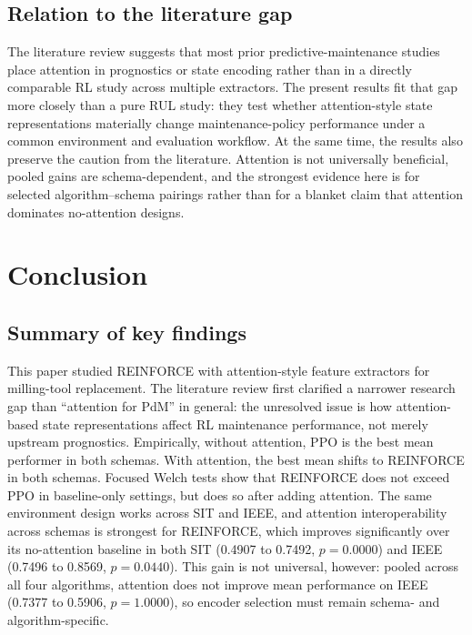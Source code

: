 \documentclass[sn-basic]{sn-jnl}%
\begin{document}
\subsection{Relation to the literature gap}
The literature review suggests that most prior predictive-maintenance studies place attention in prognostics or state encoding rather than in a directly comparable RL study across multiple extractors. The present results fit that gap more closely than a pure RUL study: they test whether attention-style state representations materially change maintenance-policy performance under a common environment and evaluation workflow. At the same time, the results also preserve the caution from the literature. Attention is not universally beneficial, pooled gains are schema-dependent, and the strongest evidence here is for selected algorithm--schema pairings rather than for a blanket claim that attention dominates no-attention designs.


\section{Conclusion} \label{sec:conclusion} %

\subsection{Summary of key findings}
This paper studied \textsc{REINFORCE} with attention-style feature extractors for milling-tool replacement. The literature review first clarified a narrower research gap than ``attention for PdM'' in general: the unresolved issue is how attention-based state representations affect RL maintenance performance, not merely upstream prognostics. Empirically, without attention, \textsc{PPO} is the best mean performer in both schemas. With attention, the best mean shifts to \textsc{REINFORCE} in both schemas. Focused Welch tests show that \textsc{REINFORCE} does not exceed \textsc{PPO} in baseline-only settings, but does so after adding attention. The same environment design works across SIT and IEEE, and attention interoperability across schemas is strongest for \textsc{REINFORCE}, which improves significantly over its no-attention baseline in both SIT (0.4907 to 0.7492, $p=0.0000$) and IEEE (0.7496 to 0.8569, $p=0.0440$). This gain is not universal, however: pooled across all four algorithms, attention does not improve mean performance on IEEE (0.7377 to 0.5906, $p=1.0000$), so encoder selection must remain schema- and algorithm-specific.
\end{document}
